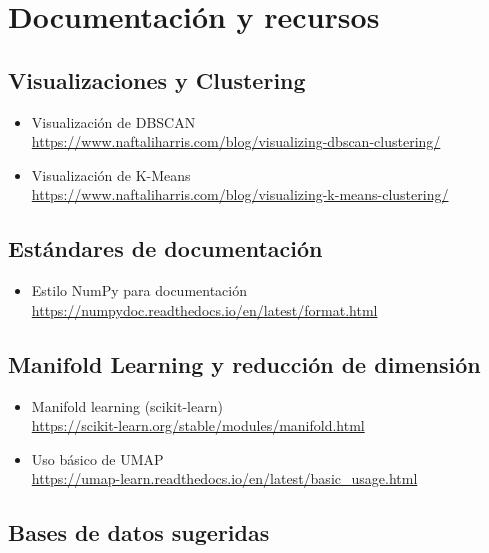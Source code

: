 \documentclass{article}
\begin{document}
\section{Documentación y recursos}

\subsection{Visualizaciones y Clustering}

\begin{itemize}
  \item Visualización de DBSCAN\\
  \url{https://www.naftaliharris.com/blog/visualizing-dbscan-clustering/}

  \item Visualización de K-Means\\
  \url{https://www.naftaliharris.com/blog/visualizing-k-means-clustering/}
\end{itemize}

\subsection{Estándares de documentación}

\begin{itemize}
  \item Estilo NumPy para documentación\\
  \url{https://numpydoc.readthedocs.io/en/latest/format.html}
\end{itemize}

\subsection{Manifold Learning y reducción de dimensión}

\begin{itemize}
  \item Manifold learning (scikit-learn)\\
  \url{https://scikit-learn.org/stable/modules/manifold.html}

  \item Uso básico de UMAP\\
  \url{https://umap-learn.readthedocs.io/en/latest/basic_usage.html}
\end{itemize}

\subsection{Bases de datos sugeridas}
\end{document}

